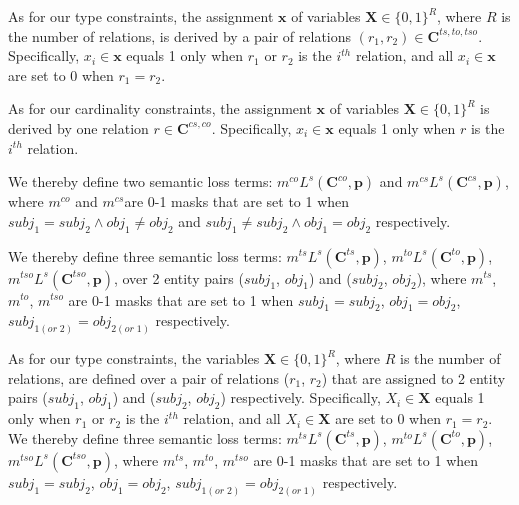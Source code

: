 As for our type constraints, the assignment $\bm x$ of variables $\bm{X}\in \{0,1\}^{R}$, where $R$ is the number of relations, 
is derived by a pair of relations $(r_1, r_2) \in \bm{C}^{ts, to, tso}$. 
Specifically, $x_i\in \bm{x}$ equals 1 only when $r_1$ or $r_2$ is the $i^{th}$ relation,
and all $x_i\in \bm{x}$ are set to 0 when $r_1=r_2$.

As for our cardinality constraints, the assignment $\bm x$ of variables $\bm{X}\in \{0,1\}^{R}$ is derived by one relation $r \in \bm{C}^{cs, co}$. 
Specifically, $x_i\in \bm{x}$ equals 1 only when $r$ is the $i^{th}$ relation.

\iffalse
We thereby define two semantic loss terms: $m^{co}L^{s}(\bm{C}^{co}, \bm{p})$ and $m^{cs}L^{s}(\bm{C}^{cs}, \bm{p})$, where $m^{co}$ and $m^{cs}$are 0-1 masks that are set to 1 when $subj_1=subj_2 \land obj_1\neq obj_2$ and $subj_1\neq subj_2 \land obj_1=obj_2$ respectively.

We thereby define three semantic loss terms: $m^{ts}L^{s}(\bm{C}^{ts}, \bm{p})$, $m^{to}L^{s}(\bm{C}^{to}, \bm{p})$, $m^{tso}L^{s}(\bm{C}^{tso}, \bm{p})$, over 2 entity pairs ($subj_1$, $obj_1$) and ($subj_2$, $obj_2$), where $m^{ts}$, $m^{to}$, $m^{tso}$ are 0-1 masks that are set to 1 when $subj_1=subj_2$, $obj_1=obj_2$, $subj_{1(or\;2)}=obj_{2(or\;1)}$ respectively.

As for our type constraints, the variables $\bm{X}\in \{0,1\}^{R}$, where $R$ is the number of relations,
are defined over a pair of relations ($r_1$, $r_2$) that are assigned to 2 entity pairs ($subj_1$, $obj_1$) and ($subj_2$, $obj_2$) respectively.
Specifically, $X_i\in \bm{X}$ equals 1 only when $r_1$ or $r_2$ is the $i^{th}$ relation,
and all $X_i\in \bm{X}$ are set to 0 when $r_1=r_2$.
We thereby define three semantic loss terms: $m^{ts}L^{s}(\bm{C}^{ts}, \bm{p})$, $m^{to}L^{s}(\bm{C}^{to}, \bm{p})$, $m^{tso}L^{s}(\bm{C}^{tso}, \bm{p})$, where $m^{ts}$, $m^{to}$, $m^{tso}$ are 0-1 masks that are set to 1 when $subj_1=subj_2$, $obj_1=obj_2$, $subj_{1(or\;2)}=obj_{2(or\;1)}$ respectively.

